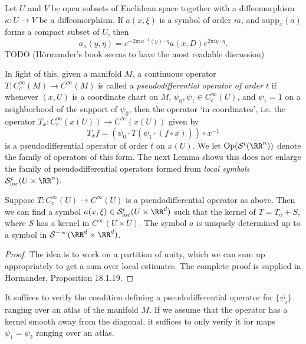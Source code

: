 \begin{theorem}
    Let $U$ and $V$ be open subsets of Euclidean space together with a diffeomorphism $\kappa: U \to V$ be a diffeomorphism. If $a(x,\xi)$ is a symbol of order $m$, and $\text{supp}_x(a)$ forms a compact subset of $U$, then
    \[ a_\kappa(y,\eta) = e^{-2 \pi i \kappa^{-1}(y) \cdot \eta} a(x,D) e^{2 \pi i y \cdot \eta}. \]
    TODO (H\"{o}rmander's book seems to have the most readable discussion)
\end{theorem}

In light of this, given a manifold $M$, a continuous operator $T: C_c^\infty(M) \to C^\infty(M)$ is called a \emph{pseudodifferential operator of order $t$} if whenever $(x,U)$ is a coordinate chart on $M$, $\psi_0, \psi_1 \in C_c^\infty(U)$, and $\psi_1 = 1$ on a neighborhood of the support of $\psi_0$, then the operator `in coordinates', i.e. the operator $T_x: C_c^\infty(x(U)) \to C^\infty(x(U))$ given by
%
\[ T_x f = \left( \psi_0 \cdot T(\psi_1 \cdot (f \circ x)) \right) \circ x^{-1} \]
%
is a pseudodifferential operator of order $t$ on $x(U)$. We let $\text{Op}(\mathcal{S}^t(\RR^n))$ denote the family of operators of this form. The next Lemma shows this does not enlarge the family of pseudodifferential operators formed from \emph{local symbols} $\mathcal{S}^t_{\text{loc}}(U \times \RR^n)$.

\begin{lemma}
    Suppose $T: C_c^\infty(U) \to C^\infty(U)$ is a pseudodifferential operator as above. Then we can find a symbol $a(x,\xi) \in \mathcal{S}^t_{\text{loc}}(U \times \RR^d)$ such that the kernel of $T = T_a + S$, where $S$ has a kernel in $C^\infty(U \times U)$. The symbol $a$ is uniquely determined up to a symbol in $\mathcal{S}^{-\infty}(\RR^d \times \RR^d)$.
\end{lemma}
\begin{proof}
    The idea is to work on a partition of unity, which we can sum up appropriately to get a sum over local estimates. The complete proof is supplied in Hormander, Proposition 18.1.19.
\end{proof}

\begin{remark}
    It suffices to verify the condition defining a pseudodifferential operator for $\{ \psi_i \}$ ranging over an atlas of the manifold $M$. If we assume that the operator has a kernel smooth away from the diagonal, it suffices to only verify it for maps $\psi_1 = \psi_2$ ranging over an atlas.
\end{remark}

